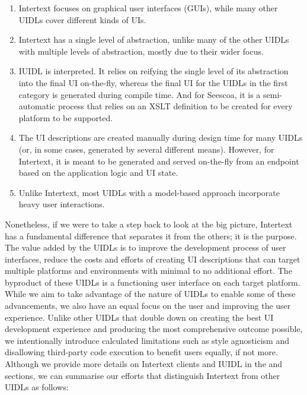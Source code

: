 \begin{enumerate}
  \item Intertext focuses on graphical user interfaces (GUIs), while many other UIDLs cover different kinds of UIs.
  
  \item Intertext has a single level of abstraction, unlike many of the other UIDLs with multiple levels of abstraction, mostly due to their wider focus.
  
  \item IUIDL is interpreted. It relies on reifying the single level of its abstraction into the final UI on-the-fly, whereas the final UI for the UIDLs in the first category is generated during compile time. And for Seescoa, it is a semi-automatic process that relies on an XSLT definition to be created for every platform to be supported.
  
  \item The UI descriptions are created manually during design time for many UIDLs (or, in some cases, generated by several different means). However, for Intertext, it is meant to be generated and served on-the-fly from an endpoint based on the application logic and UI state.
  
  \item Unlike Intertext, most UIDLs with a model-based approach incorporate heavy user interactions.
\end{enumerate}

Nonetheless, if we were to take a step back to look at the big picture, Intertext has a fundamental difference that separates it from the others; it is the purpose. The value added by the UIDLs is to improve the development process of user interfaces, reduce the costs and efforts of creating UI descriptions that can target multiple platforms and environments with minimal to no additional effort. The byproduct of these UIDLs is a functioning user interface on each target platform. While we aim to take advantage of the nature of UIDLs to enable some of these advancements, we also have an equal focus on the user and improving the user experience. Unlike other UIDLs that double down on creating the best UI development experience and producing the most comprehensive outcome possible, we intentionally introduce calculated limitations such as style agnosticism and disallowing third-party code execution to benefit users equally, if not more. Although we provide more details on Intertext clients and IUIDL in the  and  sections, we can summarise our efforts that distinguish Intertext from other UIDLs as follows:

